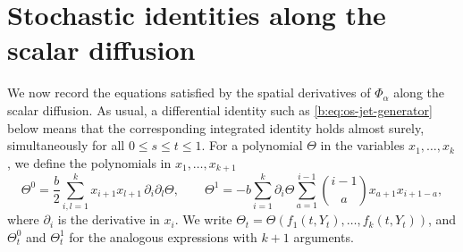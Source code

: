 \section{Stochastic identities along the scalar diffusion}
\label{sec:sc-ito}

We now record the equations satisfied by the spatial derivatives of
$\Phi_\alpha$ along the scalar diffusion. As usual, a differential identity
such as \eqref{b:eq:os-jet-generator} below means that the corresponding
integrated identity holds almost surely, simultaneously for all
$0\le s\le t\le1$. For a polynomial $\Theta$ in the variables
$x_1,\dots,x_k$, we define the polynomials in $x_1,\dots,x_{k+1}$
\begin{equation}\label{eq:sc-generator}
 \Theta^0=\frac b2\sum_{i,l=1}^kx_{i+1}x_{l+1}\,\partial_i\partial_l\Theta,
 \qquad
 \Theta^1=-b\sum_{i=1}^k\partial_i\Theta
   \sum_{a=1}^{i-1}\binom{i-1}ax_{a+1}x_{i+1-a},
\end{equation}
where $\partial_i$ is the derivative in $x_i$. We write
$\Theta_t=\Theta(f_1(t,Y_t),\dots,f_k(t,Y_t))$, and $\Theta^0_t$ and
$\Theta^1_t$ for the analogous expressions with $k+1$ arguments.

